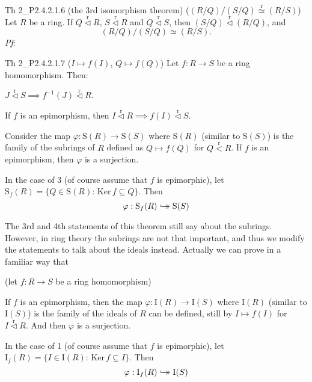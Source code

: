 \documentclass{article}
\newcommand{\nles}{\vartriangleleft}
\newcommand{\Ker}{\text{Ker}\,}
\newcommand{\hooktwoheadrightarrow}{%
        \hookrightarrow\mathrel{\mspace{-15mu}}\rightarrow}
\newcommand{\Riso}{\overset{\text{r}}{\simeq}} %
\newcommand{\subr}{\overset{\text{r}}{<}} %
\newcommand{\ideal}{\overset{\text{r}}{\nles}} %
\begin{document}
\begin{Th}{Th 2\_P2.4.2.1.6 (the 3rd isomorphism theorem) ($ (R/Q)\Big/ (S/Q) \Riso (R/S) $)}
    Let $R$ be a ring. If $Q\ideal R$, $S\ideal R$ and $Q\ideal S$, then $(S/Q)\ideal (R/Q)$, and
    $$ (R/Q)\Big/ (S/Q) \simeq (R/S). $$
    \tcblower
    \textit{Pf}:
\end{Th}

\begin{Th}{Th 2\_P2.4.2.1.7 ($I\mapsto f(I)$, $Q\mapsto f(Q)$)}
    Let $f: R\to S$ be a ring homomorphism. Then:
    \begin{compactenum}
        \item $J\ideal S \implies f^{-1}(J) \ideal R$.
        \item If $f$ is an epimorphism, then $I\ideal R \implies f(I)\ideal S$. 
        \item Consider the map $\varphi: \mathrm{S}(R)\to\mathrm{S}(S)$ where $\mathrm{S}(R)$ (similar to $\mathrm{S}(S)$) is the family of the subrings of $R$ defined as $Q\mapsto f(Q)$ for $Q\subr R$. If $f$ is an epimorphism, then $\varphi$ is a surjection.
        \item In the case of 3 (of course assume that $f$ is epimorphic), let $\mathrm{S}_f(R) = \{Q\in\mathrm{S}(R): \,\Ker f\subseteq Q\}$. Then
        $$ \varphi: \mathrm{S}_f(R)\hooktwoheadrightarrow\mathrm{S}(S) $$
    \end{compactenum}
    \tcblower
\end{Th}

\begin{Rmk}{}
    The 3rd and 4th statements of this theorem still say about the subrings. However, in ring theory the subrings are not that important, and thus we modify the statements to talk about the ideals instead. Actually we can prove in a familiar way that \textcolor{Th}{(let $f: R\to S$ be a ring homomorphism)
    \begin{compactenum}
        \item If $f$ is an epimorphism, then the map $\varphi: \mathrm{I}(R)\to\mathrm{I}(S)$ where $\mathrm{I}(R)$ (similar to $\mathrm{I}(S)$) is the family of the ideals of $R$ can be defined, still by $I\mapsto f(I)$ for $I\ideal R$. And then $\varphi$ is a surjection.
        \item In the case of 1 (of course assume that $f$ is epimorphic), let $\mathrm{I}_f(R) = \{I\in\mathrm{I}(R): \,\Ker f\subseteq I\}$. Then
        $$ \varphi: \mathrm{I}_f(R)\hooktwoheadrightarrow\mathrm{I}(S) $$
    \end{compactenum}}
\end{Rmk}
\end{document}

